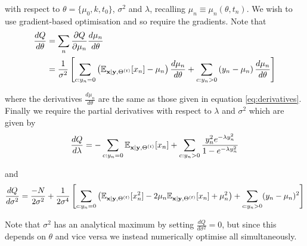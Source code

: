 with respect to $\theta = \{\mu_0, k, t_0\}$, $\sigma^2$ and $\lambda$, recalling $\mu_n \equiv \mu_n(\theta, t_n)$. We wish to use gradient-based optimisation and so require the gradients. Note that
\begin{equation}
\begin{aligned}
\frac{dQ}{d\theta} &= \sum_n \frac{\partial Q}{\partial \mu_n} \frac{d \mu_n}{d \theta} \\
& = \frac{1}{\sigma^2} \left[ \sum_{c: y_n = 0} \left(  \mathbb{E}_{{\bf x} | {\bf y}, \Theta^{(t)}} [ x_n ] - \mu_n \right) \frac{d \mu_n}{d \theta} +
\sum_{c: y_n > 0} \left( y_n - \mu_n \right) \frac{d \mu_n}{d \theta}\right]
\end{aligned}
\end{equation}

where the derivatives $\frac{d \mu_n}{d \theta}$ are the same as those given in equation \ref{eq:derivatives}. Finally we require the partial derivatives with respect to $\lambda$ and $\sigma^2$ which are given by
\begin{equation}
\frac{dQ}{d \lambda} = -\sum_{c: y_n = 0}  \mathbb{E}_{{\bf x} | {\bf y}, \Theta^{(t)}} [ x_n ] +
\sum_{c: y_n > 0} \frac{y_n^2 e^{-\lambda y_n^2}}{1 - e^{-\lambda y_n^2}}
\end{equation}

and
\begin{equation}
\frac{dQ}{d\sigma^2} = \frac{-N}{2\sigma^2} +
\frac{1}{2 \sigma^4} \left[ \sum_{c: y_n = 0} \left( \mathbb{E}_{{\bf x} | {\bf y}, \Theta^{(t)}} [ x_n^2 ] - 2 \mu_n \mathbb{E}_{{\bf x} | {\bf y}, \Theta^{(t)}} [ x_n ] + \mu_n^2 \right) +
\sum_{c: y_n > 0} (y_n - \mu_n)^2 \right]
\end{equation}

Note that $\sigma^2$ has an analytical maximum by setting $\frac{dQ}{d\sigma^2} = 0$, but since this depends on $\theta$ and vice versa we instead numerically optimise all simultaneously.
